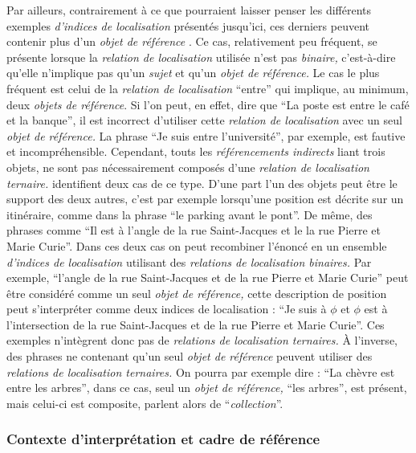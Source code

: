 Par ailleurs, contrairement à ce que pourraient laisser penser les
différents exemples \emph{d'indices de localisation} présentés
jusqu'ici, ces derniers peuvent contenir plus d'un \emph{objet de
  référence} \autocite{Clementini2013}. Ce cas, relativement peu
fréquent, se présente lorsque la \emph{relation de localisation}
utilisée n'est pas \emph{binaire,} c'est-à-dire qu'elle n'implique pas
qu'un \emph{sujet} et qu'un \emph{objet de référence.} Le cas le plus
fréquent est celui de la \emph{relation de localisation}
\enquote{entre} qui implique, au minimum, deux \emph{objets de
  référence}. Si l'on peut, en effet, dire que \enquote{La poste est
  entre le café et la banque}, il est incorrect d'utiliser cette
\emph{relation de localisation} avec un seul \emph{objet de
  référence.} La phrase \enquote{Je suis entre l'université}, par
exemple, est fautive et incompréhensible. Cependant, touts les
\emph{référencements indirects} liant trois objets, ne sont pas
nécessairement composés d'une \emph{relation de localisation
  ternaire.} \textcite{Duchene2019} identifient deux cas de ce
type. D'une part l'un des objets peut être le support des deux autres,
c'est par exemple lorsqu'une position est décrite sur un itinéraire,
comme dans la phrase \enquote{le parking avant le pont}. De même, des
phrases comme \enquote{Il est à l'angle de la rue Saint-Jacques et le
  la rue Pierre et Marie Curie}. Dans ces deux cas on peut recombiner
l'énoncé en un ensemble \emph{d'indices de localisation} utilisant des
\emph{relations de localisation binaires.} Par exemple,
\enquote{l'angle de la rue Saint-Jacques et de la rue Pierre et Marie
  Curie} peut être considéré comme un seul \emph{objet de référence,}
cette description de position peut s'interpréter comme deux indices de
localisation : \enquote{Je suis à $\phi$ et $\phi$ est à
  l'intersection de la rue Saint-Jacques et de la rue Pierre et Marie
  Curie}. Ces exemples n’intègrent donc pas de \emph{relations de
  localisation ternaires.} À l'inverse, des phrases ne contenant qu'un
seul \emph{objet de référence} peuvent utiliser des \emph{relations de
  localisation ternaires.} On pourra par exemple dire : \enquote{La
  chèvre est entre les arbres}, dans ce cas, seul un \emph{objet de
  référence,} \enquote{les arbres}, est présent, mais celui-ci est
composite, \textcite{Aurnague1993} parlent alors de
\enquote{\emph{collection}}. 


\subsubsection{Contexte d'interprétation et cadre de référence}

